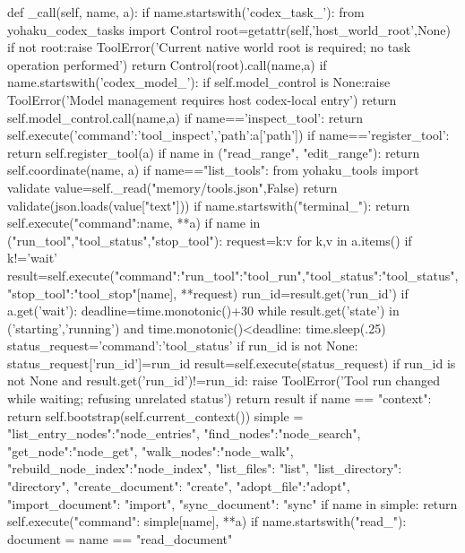     def _call(self, name, a):
        if name.startswith('codex_task_'):
            from yohaku_codex_tasks import Control
            root=getattr(self,'host_world_root',None)
            if not root:raise ToolError('Current native world root is required; no task operation performed')
            return Control(root).call(name,a)
        if name.startswith('codex_model_'):
            if self.model_control is None:raise ToolError('Model management requires host codex-local entry')
            return self.model_control.call(name,a)
        if name=='inspect_tool':
            return self.execute({'command':'tool_inspect','path':a['path']})
        if name=='register_tool':
            return self.register_tool(a)
        if name in ("read_range", "edit_range"):
            return self.coordinate(name, a)
        if name=="list_tools":
            from yohaku_tools import validate
            value=self._read("memory/tools.json",False)
            return validate(json.loads(value["text"]))
        if name.startswith("terminal_"):
            return self.execute({"command":name, **a})
        if name in ("run_tool","tool_status","stop_tool"):
            request={k:v for k,v in a.items() if k!='wait'}
            result=self.execute({"command":{"run_tool":"tool_run","tool_status":"tool_status","stop_tool":"tool_stop"}[name], **request})
            run_id=result.get('run_id')
            if a.get('wait'):
                deadline=time.monotonic()+30
                while result.get('state') in ('starting','running') and time.monotonic()<deadline:
                    time.sleep(.25)
                    status_request={'command':'tool_status'}
                    if run_id is not None:
                        status_request['run_id']=run_id
                    result=self.execute(status_request)
                    if run_id is not None and result.get('run_id')!=run_id:
                        raise ToolError('Tool run changed while waiting; refusing unrelated status')
            return result
        if name == "context":
            return self.bootstrap(self.current_context())
        simple = {"list_entry_nodes":"node_entries", "find_nodes":"node_search", "get_node":"node_get", "walk_nodes":"node_walk", "rebuild_node_index":"node_index",
            "list_files": "list", "list_directory": "directory", "create_document": "create", "adopt_file":"adopt",
            "import_document": "import", "sync_document": "sync"}
        if name in simple:
            return self.execute({"command": simple[name], **a})
        if name.startswith("read_"):
            document = name == "read_document"
